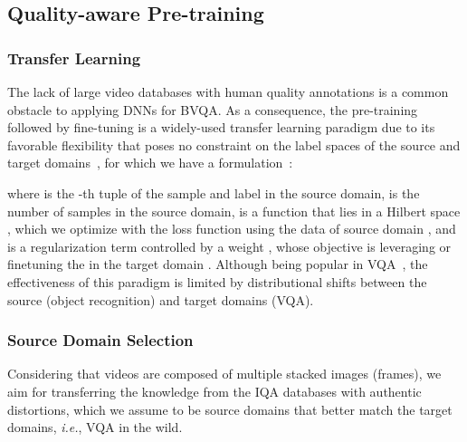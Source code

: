 \documentclass[journal]{IEEEtran}
\begin{document}
\subsection{Quality-aware Pre-training}\label{Subsec:QualityAwarePrT}
\subsubsection{Transfer Learning}\label{Subsubsec:TransferLearning}
The lack of large video databases with human quality annotations is a common obstacle to applying DNNs for BVQA. As a consequence, the pre-training followed by fine-tuning is a widely-used transfer learning paradigm due to its favorable flexibility that poses no constraint on the label spaces of the source and target domains~\cite{pan2010survey}, for which we have a formulation~\cite{tlbook}:

where  is the -th tuple of the sample and label in the source domain,  is the number of samples in the source domain,  is a function that lies in a Hilbert space , which we optimize with the loss function  using the data of source domain , and  is a regularization term controlled by a weight , whose objective is leveraging or finetuning the  in the target domain . Although being popular in VQA~\cite{li2019quality, li2021unified, tu2021rapique}, the effectiveness of this paradigm is limited by distributional shifts between the source (object recognition) and target domains (VQA).

\subsubsection{Source Domain Selection}\label{Subsubsec:SourceDomainSelection}
Considering that videos are composed of multiple stacked images (frames), we aim for transferring the knowledge from the IQA databases with authentic distortions, which we assume to be source domains that better match the target domains, \textit{i.e.}, VQA in the wild.
\end{document}
